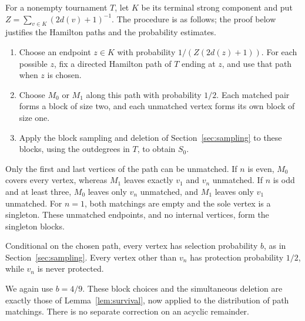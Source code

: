 \documentclass[12pt]{article}
\begin{document}
For a nonempty tournament \(T\), let \(K\) be its terminal strong component and put \(Z=\sum_{v\in K}(2d(v)+1)^{-1}\). The procedure is as follows; the proof below justifies the Hamilton paths and the probability estimates.
\begin{enumerate}
\item Choose an endpoint \(z\in K\) with probability \(1/(Z(2d(z)+1))\). For each possible \(z\), fix a directed Hamilton path of \(T\) ending at \(z\), and use that path when \(z\) is chosen.
\item Choose \(M_0\) or \(M_1\) along this path with probability \(1/2\). Each matched pair forms a block of size two, and each unmatched vertex forms its own block of size one.
\item Apply the block sampling and deletion of Section~\ref{sec:sampling} to these blocks, using the outdegrees in $T$, to obtain $S_0$.
\end{enumerate}
Only the first and last vertices of the path can be unmatched. If \(n\) is even, \(M_0\) covers every vertex, whereas \(M_1\) leaves exactly \(v_1\) and \(v_n\) unmatched. If \(n\) is odd and at least three, \(M_0\) leaves only \(v_n\) unmatched, and \(M_1\) leaves only \(v_1\) unmatched. For \(n=1\), both matchings are empty and the sole vertex is a singleton. These unmatched endpoints, and no internal vertices, form the singleton blocks.

Conditional on the chosen path, every vertex has selection probability $b$, as in Section~\ref{sec:sampling}. Every vertex other than $v_n$ has protection probability $1/2$, while $v_n$ is never protected.

We again use \(b=4/9\). These block choices and the simultaneous deletion are exactly those of Lemma~\ref{lem:survival}, now applied to the distribution of path matchings. There is no separate correction on an acyclic remainder.
\end{document}
